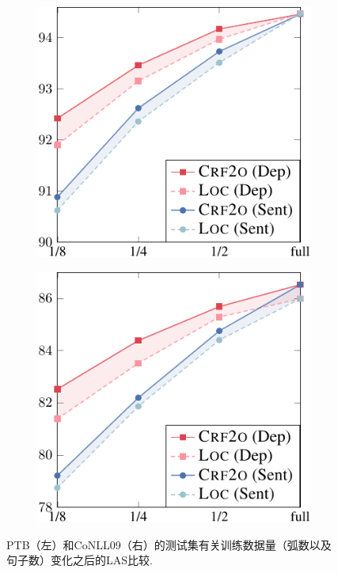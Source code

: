 \begin{figure}[tb!]
    \centering
    \begin{subfigure}[b]{0.4\textwidth}
        \centering
        \includegraphics[width=1.\textwidth]{figures/part-gap-ptb.pdf}
    \end{subfigure}
    \begin{subfigure}[b]{0.4\textwidth}
        \centering
        \includegraphics[width=1.\textwidth]{figures/part-gap-conll.pdf}
    \end{subfigure}
    \caption{
        PTB（左）和CoNLL09（右）的测试集有关训练数据量（弧数以及句子数）变化之后的LAS比较.
    }
    \label{fig:part-gap}
\end{figure}

